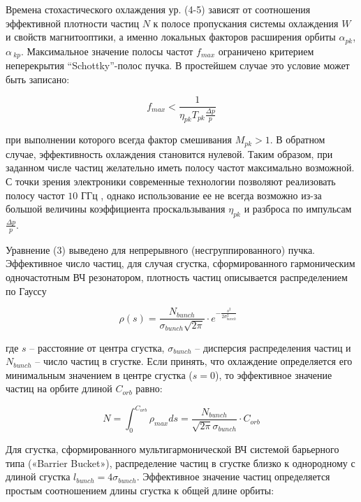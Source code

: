 Времена стохастического охлаждения ур. (4-5) зависят от соотношения эффективной плотности частиц $N$ к полосе пропускания системы охлаждения $W$ и свойств магнитооптики, а именно локальных факторов расширения орбиты $\alpha_{pk}$, $\alpha_{\ kp}$.  
\noindent Максимальное значение полосы частот $f_{max}$ ограничено критерием неперекрытия “Schottky”-полос пучка. В простейшем случае это условие может быть записано:

\begin{equation}
f_{max}<\frac{1}{\eta_{pk}T_{pk}\frac{\Delta p}{p}}
\end{equation}	

\noindent при выполнении которого всегда фактор смешивания $M_{pk}>1$. В обратном случае, эффективность охлаждения становится нулевой. Таким образом, при заданном числе частиц желательно иметь полосу частот максимально возможной. С точки зрения электроники современные технологии позволяют реализовать полосу частот $10$ ГГц \cite{caspers:stochastic}, однако использование ее не всегда возможно из-за большой величины коэффициента проскальзывания $\eta_{pk}$ и разброса по импульсам $\frac{\Delta p}{p}$.

\noindent Уравнение (3) выведено для непрерывного (несгруппированного) пучка.  Эффективное число частиц, для случая сгустка, сформированного гармоническим одночастотным ВЧ резонатором, плотность частиц описывается распределением по Гауссу

\begin{equation}
\rho(s)=\frac{N_{bunch}}{\sigma_{bunch}\sqrt{2\pi}}\cdot e^{-\frac{s^2}{2\sigma_{bunch}^2}}\ \ \ 
\end{equation}	

\noindent где $s$ – расстояние от центра сгустка, $\sigma_{bunch}$ – дисперсия распределения частиц и $N_{bunch}$ – число частиц в сгустке. Если принять, что охлаждение определяется его минимальным значением в центре сгустка ($s=0$), то эффективное значение частиц на орбите длиной $C_{orb}$ равно:

\begin{equation}
N=\int_{0}^{C_{orb}}{\rho_{max}ds}=\frac{N_{bunch}}{\sqrt{2\pi}\sigma_{bunch}}\cdot C_{orb}
\end{equation}

\noindent Для сгустка, сформированного мультигармонической ВЧ системой барьерного типа («Barrier Bucket»), распределение частиц в сгустке близко к однородному с длиной сгустка $l_{bunch}=4\sigma_{bunch}$. Эффективное значение частиц определяется простым соотношением длины сгустка к общей длине орбиты:

